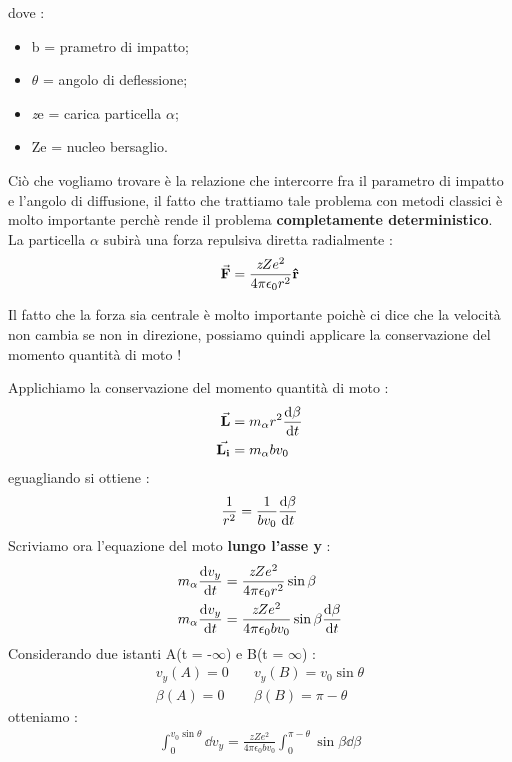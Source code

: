 dove : 
\begin{itemize}
        \item b = prametro di impatto; 
        \item $\theta$ = angolo di deflessione;
        \item \textit{z}e = carica particella $\alpha$; 
        \item Ze = nucleo bersaglio.
\end{itemize}
Ciò che vogliamo trovare è la relazione che intercorre fra il parametro di impatto e l'angolo
di diffusione, il fatto che trattiamo tale problema con metodi classici è molto importante 
perchè rende il problema \textbf{completamente deterministico}. \\
\newpage
La particella $\alpha$ subirà una forza repulsiva diretta radialmente :
\begin{align*}
    \va{F} = \frac{\textit{z}Ze^2}{4\pi \epsilon_{0}r^2}\vu{r}
\end{align*}
\begin{tcolorbox}[colback=red!5!white,colframe=red!50!black,title=ATTENZIONE !]
Il fatto che la forza sia centrale è molto importante poichè ci dice che la velocità non 
cambia se non in direzione, possiamo quindi applicare la conservazione del momento quantità 
di moto !
\end{tcolorbox}
Applichiamo la conservazione del momento quantità di moto : 
\begin{align*}
        \va{L} &= m_{\alpha}r^2\dv{\beta}{t} \\ 
        \va{L_{i}} &= m_{\alpha}bv_{0} 
\end{align*}
eguagliando si ottiene : 
\begin{align*}
    \frac{1}{r^2} = \frac{1}{bv_{0}}\dv{\beta}{t}
\end{align*}
Scriviamo ora l'equazione del moto \textbf{lungo l'asse y} : 
\begin{align*}
        m_{\alpha}\dv{v_{y}}{t} &= \frac{\textit{z}Ze^2}{4\pi\epsilon_{0}r^2}\sin{\beta} \\
        m_{\alpha}\dv{v_{y}}{t} &= \frac{\textit{z}Ze^2}{4\pi\epsilon_{0}bv_{0}}\sin{\beta}\dv{\beta}{t}
\end{align*}
Considerando due istanti A(t = -$\infty$) e B(t = $\infty$) : 
\begin{align*}
    v_{y}(A) = 0  & \quad  v_{y}(B) = v_{0}\sin{\theta} \\
    \beta(A) = 0  & \quad  \beta(B) = \pi - \theta 
\end{align*}
otteniamo : 
\begin{align*}
        \int_{0}^{v_{0}\sin{\theta}}\dd{v_{y}} = \frac{\textit{z}Ze^2}{4\pi\epsilon_{0}bv_{0}}\int_{0}^{\pi - \theta}\sin{\beta}\dd{\beta}
\end{align*}
